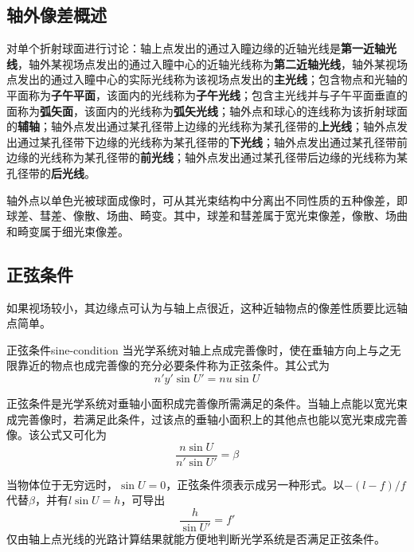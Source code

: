 \documentclass[cn,10pt,chinesefont=founder,math=mtpro2,cite=super,toc=onecol,twoside,openany]{elegantbook}
\begin{document}
\subsection{轴外像差概述}
对单个折射球面进行讨论：轴上点发出的通过入瞳边缘的近轴光线是\textbf{第一近轴光线}，轴外某视场点发出的通过入瞳中心的近轴光线称为\textbf{第二近轴光线}，轴外某视场点发出的通过入瞳中心的实际光线称为该视场点发出的\textbf{主光线}；包含物点和光轴的平面称为\textbf{子午平面}，该面内的光线称为\textbf{子午光线}；包含主光线并与子午平面垂直的面称为\textbf{弧矢面}，该面内的光线称为\textbf{弧矢光线}；轴外点和球心的连线称为该折射球面的\textbf{辅轴}；轴外点发出通过某孔径带上边缘的光线称为某孔径带的\textbf{上光线}；轴外点发出通过某孔径带下边缘的光线称为某孔径带的\textbf{下光线}；轴外点发出通过某孔径带前边缘的光线称为某孔径带的\textbf{前光线}；轴外点发出通过某孔径带后边缘的光线称为某孔径带的\textbf{后光线}。
\begin{conclusion}
	轴外点以单色光被球面成像时，可从其光束结构中分离出不同性质的五种像差，即球差、彗差、像散、场曲、畸变。其中，球差和彗差属于宽光束像差，像散、场曲和畸变属于细光束像差。
\end{conclusion}
\subsection{正弦条件}
如果视场较小，其边缘点可认为与轴上点很近，这种近轴物点的像差性质要比远轴点简单。

\begin{definition}{正弦条件}{sine-condition}
	当光学系统对轴上点成完善像时，使在垂轴方向上与之无限靠近的物点也成完善像的充分必要条件称为正弦条件。其公式为
	\begin{equation}
	n'y'\sin U'=nu\sin U
	\end{equation}
\end{definition}

正弦条件是光学系统对垂轴小面积成完善像所需满足的条件。当轴上点能以宽光束成完善像时，若满足此条件，过该点的垂轴小面积上的其他点也能以宽光束成完善像。该公式又可化为
\begin{equation}
\frac{n\sin U}{n'\sin U'}=\beta
\end{equation}

当物体位于无穷远时，$\sin U=0$，正弦条件须表示成另一种形式。以$-(l-f)/f$代替$\beta$，并有$l\sin U=h$，可导出
\begin{equation}
\frac{h}{\sin U'}=f'
\end{equation}
仅由轴上点光线的光路计算结果就能方便地判断光学系统是否满足正弦条件。
\end{document}
